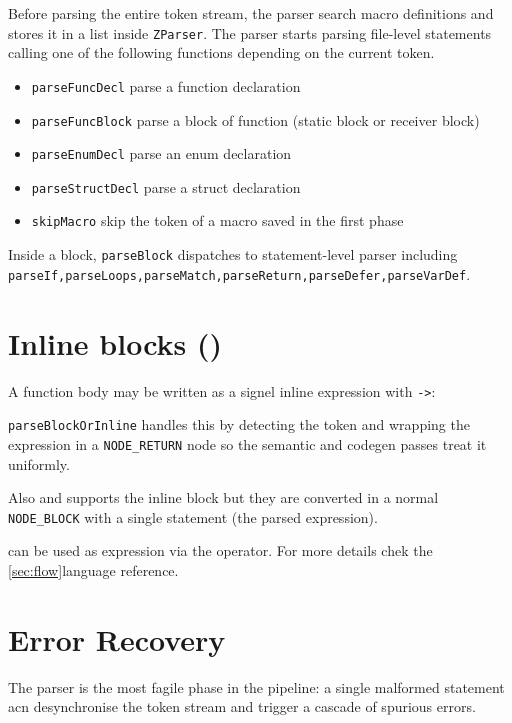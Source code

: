 Before parsing the entire token stream, the parser search macro definitions and stores it in a list inside \texttt{ZParser}.
The parser starts parsing file-level statements calling one of the following functions depending on the current token.
\begin{itemize}
    \item{\texttt{parseFuncDecl}} parse a function declaration
    \item{\texttt{parseFuncBlock}} parse a block of function (static block or receiver block)
    \item{\texttt{parseEnumDecl}} parse an enum declaration
    \item{\texttt{parseStructDecl}} parse a struct declaration
    \item{\texttt{skipMacro}} skip the token of a macro saved in the first phase
\end{itemize}

Inside a block, \texttt{parseBlock} dispatches to statement-level parser including \texttt{parseIf,parseLoops,parseMatch,parseReturn,parseDefer,parseVarDef}.


\section{Inline blocks (\zn{->})}
A function body may be written as a signel inline expression with \texttt{->}:

\texttt{parseBlockOrInline} handles this by detecting the \zn{->} token and wrapping the expression in a \texttt{NODE\_RETURN} node so the semantic and codegen passes treat it uniformly.

Also  and  supports the inline block but they are converted in a normal \texttt{NODE\_BLOCK} with a single statement (the parsed expression).

\begin{note}
     can be used as expression via the \zn{->} operator. For more details chek the \ref{sec:flow}{language reference}.
\end{note}

\section{Error Recovery}
The parser is the most fagile phase in the pipeline: a single malformed statement acn desynchronise the token stream and trigger a cascade of spurious errors.


